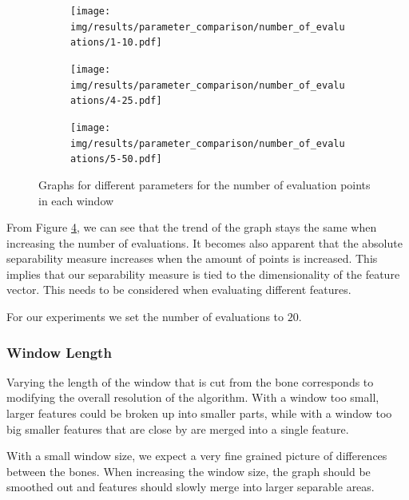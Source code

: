 \documentclass[pdftex,12pt,a4paper]{report}
\begin{document}
\begin{figure}[h]
	\centering
	\begin{subfigure}[b]{0.32\textwidth}
		\centering
		\texttt{[image: img/results/parameter\_comparison/number\_of\_evaluations/1-10.pdf]}
		\label{fig:number-evaluations-0}
	\end{subfigure}
	\begin{subfigure}[b]{0.32\textwidth}
		\centering
		\texttt{[image: img/results/parameter\_comparison/number\_of\_evaluations/4-25.pdf]}
		\label{fig:number-evaluations-1}
	\end{subfigure}
	\begin{subfigure}[b]{0.32\textwidth}
		\centering
		\texttt{[image: img/results/parameter\_comparison/number\_of\_evaluations/5-50.pdf]}
		\label{fig:number-evaluations-2}
	\end{subfigure}
	\caption{Graphs for different parameters for the number of evaluation points in each window}
	\label{fig:number-evaluations}
\end{figure}

From Figure \ref{fig:number-evaluations}, we can see that the trend of the graph stays the same when increasing the number of evaluations. It becomes also apparent that the absolute separability measure increases when the amount of points is increased. This implies that our separability measure is tied to the dimensionality of the feature vector. This needs to be considered when evaluating different features.

For our experiments we set the number of evaluations to $20$.

\subsubsection{Window Length}

Varying the length of the window that is cut from the bone corresponds to modifying the overall resolution of the algorithm. With a window too small, larger features could be broken up into smaller parts, while with a window too big smaller features that are close by are merged into a single feature.

With a small window size, we expect a very fine grained picture of differences between the bones. When increasing the window size, the graph should be smoothed out and features should slowly merge into larger separable areas.
\end{document}
